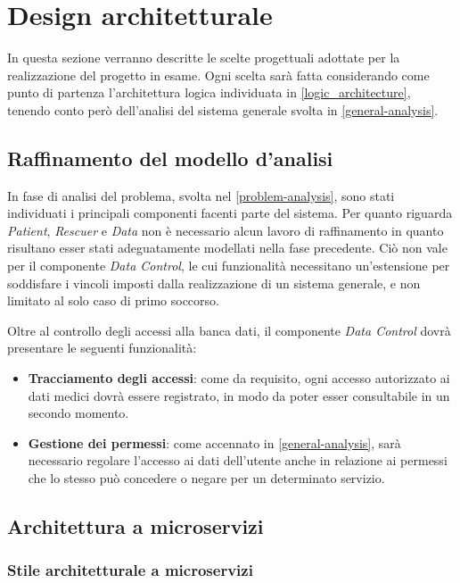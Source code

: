 \documentclass[a4paper,12pt]{report}
\begin{document}
\chapter{Design architetturale} \label{design}

In questa sezione verranno descritte le scelte progettuali adottate per la realizzazione del progetto in esame. Ogni scelta sarà fatta considerando come punto di partenza l'architettura logica individuata in \autoref{logic_architecture}, tenendo conto però dell'analisi del sistema generale svolta in \autoref{general-analysis}.

\section{Raffinamento del modello d'analisi}

In fase di analisi del problema, svolta nel \autoref{problem-analysis}, sono stati individuati i principali componenti facenti parte del sistema. Per quanto riguarda \emph{Patient}, \emph{Rescuer} e \emph{Data} non è necessario alcun lavoro di raffinamento in quanto risultano esser stati adeguatamente modellati nella fase precedente. Ciò non vale per il componente \emph{Data Control}, le cui funzionalità necessitano un'estensione per soddisfare i vincoli imposti dalla realizzazione di un sistema generale, e non limitato al solo caso di primo soccorso.

Oltre al controllo degli accessi alla banca dati, il componente \emph{Data Control} dovrà presentare le seguenti funzionalità:
\begin{itemize}
	\item \textbf{Tracciamento degli accessi}: come da requisito, ogni accesso autorizzato ai dati medici dovrà essere registrato, in modo da poter esser consultabile in un secondo momento.
	\item \textbf{Gestione dei permessi}: come accennato in \autoref{general-analysis}, sarà necessario regolare l'accesso ai dati dell'utente anche in relazione ai permessi che lo stesso può concedere o negare per un determinato servizio.
\end{itemize}

\section{Architettura a microservizi}

\subsection{Stile architetturale a microservizi}
\end{document}
